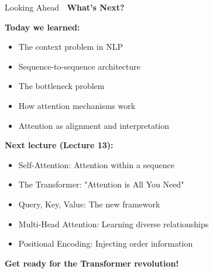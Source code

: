 \documentclass[aspectratio=169]{beamer}
\begin{document}
\begin{frame}[shrink=10]{Looking Ahead 🔮}
\textbf{What's Next?}

\vspace{1em}

\textbf{Today we learned:}
\begin{itemize}\setlength{\itemsep}{0pt}
    \item The context problem in NLP
    \item Sequence-to-sequence architecture
    \item The bottleneck problem
    \item How attention mechanisms work
    \item Attention as alignment and interpretation
\end{itemize}

\vspace{1em}

\textbf{Next lecture (Lecture 13):}
\begin{itemize}\setlength{\itemsep}{0pt}
    \item \alert{Self-Attention}: Attention within a sequence
    \item \alert{The Transformer}: "Attention is All You Need"
    \item \alert{Query, Key, Value}: The new framework
    \item \alert{Multi-Head Attention}: Learning diverse relationships
    \item \alert{Positional Encoding}: Injecting order information
\end{itemize}

\vspace{1em}

\begin{center}
\Large
\textbf{Get ready for the Transformer revolution! 🚀}
\end{center}
\end{frame}
\end{document}
